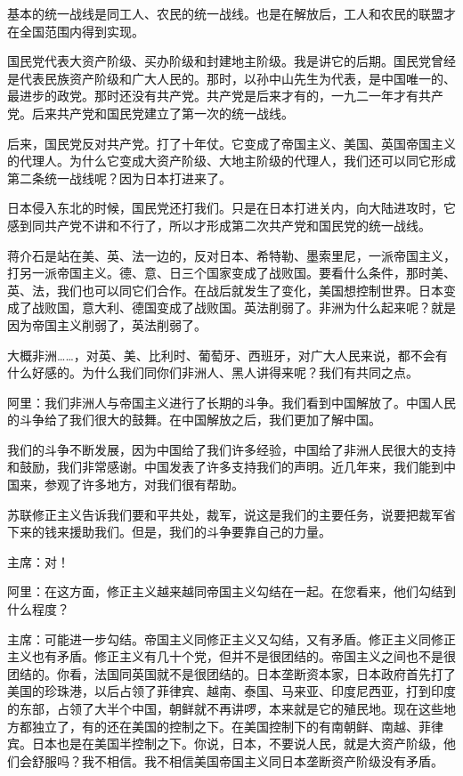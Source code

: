 基本的统一战线是同工人、农民的统一战线。也是在解放后，工人和农民的联盟才在全国范围内得到实现。

国民党代表大资产阶级、买办阶级和封建地主阶级。我是讲它的后期。国民党曾经是代表民族资产阶级和广大人民的。那时，以孙中山先生为代表，是中国唯一的、最进步的政党。那时还没有共产党。共产党是后来才有的，一九二一年才有共产党。后来共产党和国民党建立了第一次的统一战线。

后来，国民党反对共产党。打了十年仗。它变成了帝国主义、美国、英国帝国主义的代理人。为什么它变成大资产阶级、大地主阶级的代理人，我们还可以同它形成第二条统一战线呢？因为日本打进来了。

日本侵入东北的时候，国民党还打我们。只是在日本打进关内，向大陆进攻时，它感到同共产党不讲和不行了，所以才形成第二次共产党和国民党的统一战线。

蒋介石是站在美、英、法一边的，反对日本、希特勒、墨索里尼，一派帝国主义，打另一派帝国主义。德、意、日三个国家变成了战败国。要看什么条件，那时美、英、法，我们也可以同它们合作。在战后就发生了变化，美国想控制世界。日本变成了战败国，意大利、德国变成了战败国。英法削弱了。非洲为什么起来呢？就是因为帝国主义削弱了，英法削弱了。

大概非洲……，对英、美、比利时、葡萄牙、西班牙，对广大人民来说，都不会有什么好感的。为什么我们同你们非洲人、黑人讲得来呢？我们有共同之点。

阿里：我们非洲人与帝国主义进行了长期的斗争。我们看到中国解放了。中国人民的斗争给了我们很大的鼓舞。在中国解放之后，我们更加了解中国。

我们的斗争不断发展，因为中国给了我们许多经验，中国给了非洲人民很大的支持和鼓励，我们非常感谢。中国发表了许多支持我们的声明。近几年来，我们能到中国来，参观了许多地方，对我们很有帮助。

苏联修正主义告诉我们要和平共处，裁军，说这是我们的主要任务，说要把裁军省下来的钱来援助我们。但是，我们的斗争要靠自己的力量。

主席：对！

阿里：在这方面，修正主义越来越同帝国主义勾结在一起。在您看来，他们勾结到什么程度？

主席：可能进一步勾结。帝国主义同修正主义又勾结，又有矛盾。修正主义同修正主义也有矛盾。修正主义有几十个党，但并不是很团结的。帝国主义之间也不是很团结的。你看，法国同英国就不是很团结的。日本垄断资本家，日本政府首先打了美国的珍珠港，以后占领了菲律宾、越南、泰国、马来亚、印度尼西亚，打到印度的东部，占领了大半个中国，朝鲜就不再讲啰，本来就是它的殖民地。现在这些地方都独立了，有的还在美国的控制之下。在美国控制下的有南朝鲜、南越、菲律宾。日本也是在美国半控制之下。你说，日本，不要说人民，就是大资产阶级，他们会舒服吗？我不相信。我不相信美国帝国主义同日本垄断资产阶级没有矛盾。

